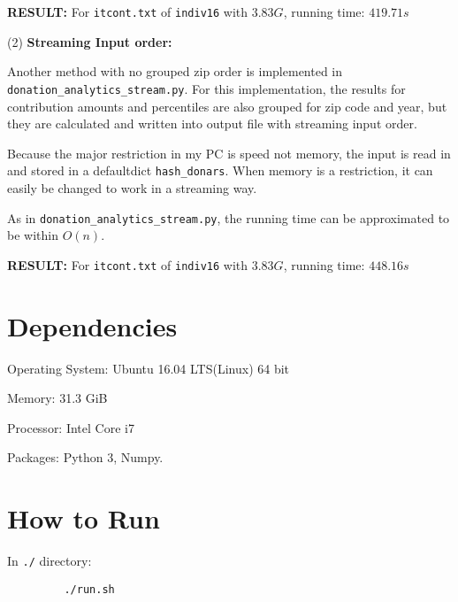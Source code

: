 \documentclass[twoside]{article}
\begin{document}
 \bigskip
 
 \textbf{RESULT:} For \verb|itcont.txt| of \verb|indiv16| with $3.83G$, running time: $419.71s$
 
  \bigskip
 
 (2) \textbf{Streaming Input order: }
 
 Another method with no grouped zip order is implemented in \verb|donation_analytics_stream.py|. For this implementation, the results for contribution amounts and percentiles are also grouped for zip code and year, but they are calculated and written into output file with streaming input order. 
 
Because the major restriction in my PC is speed not memory, the input is read in and stored in a defaultdict \verb|hash_donars|. When memory is a restriction, it can easily be changed to work in a streaming way. 
 
 As in \verb|donation_analytics_stream.py|, the running time can be approximated to be within $O(n)$. 
 
  \bigskip
 
 \textbf{RESULT:} For \verb|itcont.txt| of \verb|indiv16| with $3.83G$, running time: $448.16s$
 
  \bigskip
 
 \section{Dependencies}

\hspace{10ex} Operating System: Ubuntu 16.04 LTS(Linux) 64 bit

\hspace{10ex} Memory: 31.3 GiB

\hspace{10ex} Processor: Intel Core i7

\hspace{10ex} Packages: Python 3, Numpy. 

\section{ How to Run } %

\bigskip

\hspace{4ex} In \verb|./| directory:

\begin{verbatim}
         ./run.sh
\end{verbatim}
\end{document}
